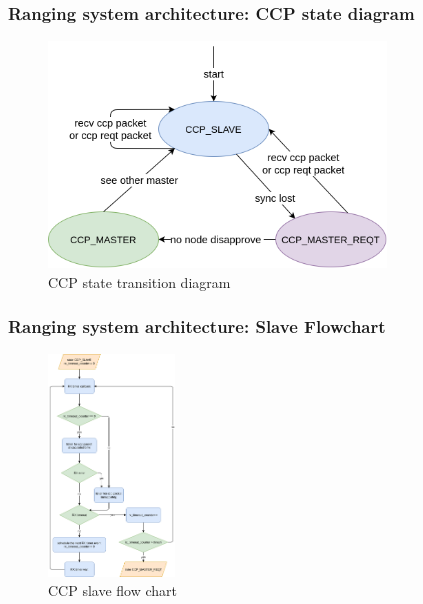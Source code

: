 \documentclass[10pt]{beamer}
\begin{document}

\begin{frame}
    \frametitle{Ranging system architecture: CCP state diagram}
        \begin{figure}[H]
            \centering
            \includegraphics[width=0.8\textwidth]{ccp_state_diagram.png}
            \caption{CCP state transition diagram}
            \label{fig:CCP_state_diagram}
        \end{figure}
\end{frame}

\begin{frame}
    \frametitle{Ranging system architecture: Slave Flowchart}
    \begin{figure}[H]
        \centering
        \includegraphics[width=0.3\textwidth, trim={0 0 {0.5\width} 0}]{ccp_slave_flow_chart.png}
        \caption{CCP slave flow chart}
        \label{fig:ccp_slave_flow_chart}
    \end{figure}
\end{frame}
\end{document}
